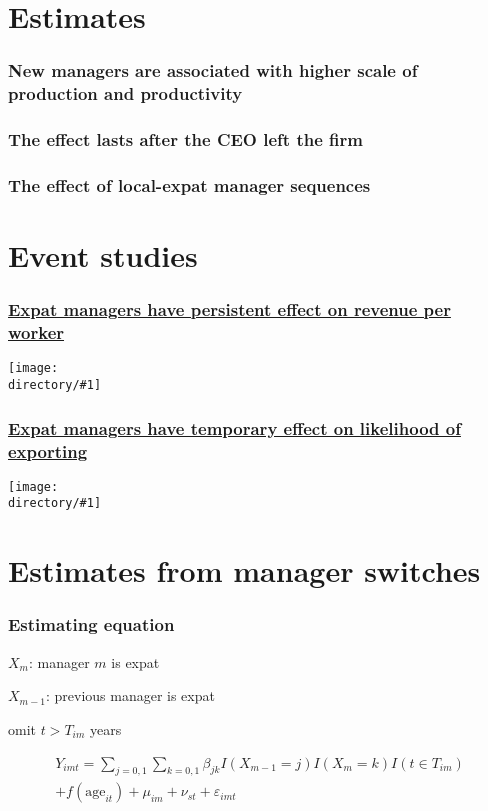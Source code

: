 \documentclass[aspectratio=43,compress,mathserif]{beamer}
\newcommand{\regressiontable}[1]{}
\newcounter{ora}
\newcommand{\directory}{output/figure}
\newcommand{\widefigure}[2]{\begin{frame}\frametitle{\hyperlink{#1back}{#2}}\hypertarget{#1}{{\begin{center}\texttt{[image: \\directory/\#1]}\end{center}}}\end{frame}}
\begin{document}
\section{Estimates}\hypertarget{Estimates}{}


\begin{frame}\frametitle{New managers are associated with higher scale of production and productivity}\hypertarget{New managers are associated with higher scale of production and productivity}{}
\regressiontable{direct_effect_1}


\end{frame}



\begin{frame}\frametitle{The effect lasts after the CEO left the firm}\hypertarget{The effect lasts after the CEO left the firm}{}
\regressiontable{long_effect_1}


\end{frame}



\begin{frame}\frametitle{The effect of local-expat manager sequences}\hypertarget{The effect of local-expat manager sequences}{}
\regressiontable{switch_effect_1}




\end{frame}







\section{Event studies}\hypertarget{Event studies}{}
\widefigure{lnQL_event_study}{Expat managers have persistent effect on revenue per worker}
\widefigure{exporter_event_study}{Expat managers have temporary effect on likelihood of exporting}








\section{Estimates from manager switches}\hypertarget{Estimates from manager switches}{}


\begin{frame}\frametitle{Estimating equation}\hypertarget{Estimating equation}{}
$X_{m}$: manager $m$ is expat 


$X_{m-1}$: previous manager is expat 


omit $t>T_{im}$ years


\begin{multline*}
Y_{imt} = 
\sum_{j=0,1}\sum_{k=0,1} \beta_{jk} I(X_{m-1}=j)I(X_{m}=k)I(t\in T_{im})\\
+f(\text{age}_{it})
+\mu_{im} + \nu_{st} + \varepsilon_{imt}
\end{multline*}


\end{frame}
\end{document}
